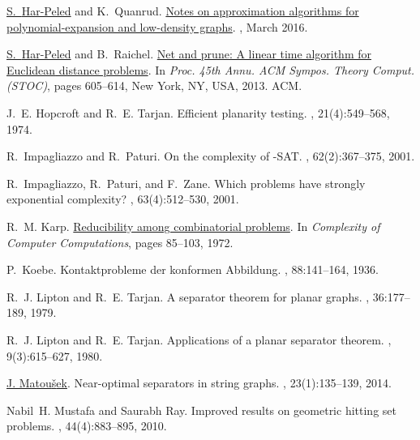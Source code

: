 \documentclass[12pt]{article}
\theoremstyle{remark}\theoremheaderfont{\sf}\theorembodyfont{\upshape}
\numberwithin{figure}{section}\numberwithin{table}{section}\numberwithin{equation}{section}
\begin{document}
{\begin{thebibliography}{vdSOdBV98}
\href{http://sarielhp.org}{S.~{{Har-Peled}}} and K.~{Quanrud}.
\newblock \href{http://arxiv.org/abs/1603.03098}{Notes on approximation
  algorithms for polynomial-expansion and low-density graphs}.
, March 2016.

\href{http://sarielhp.org}{S.~{{Har-Peled}}} and B.~Raichel.
\newblock \href{http://cs.uiuc.edu/~sariel/papers/12/aggregate/}{Net and prune:
  A linear time algorithm for {Euclidean} distance problems}.
\newblock In {\em Proc. 45th Annu. ACM Sympos. Theory Comput. {\em(STOC)}},
  pages 605--614, New York, NY, USA, 2013. ACM.

J.~E. Hopcroft and R.~E. Tarjan.
\newblock  Efficient planarity testing.
, 21(4):549--568, 1974.

R.~Impagliazzo and R.~Paturi.
\newblock  On the complexity of {}-{SAT}.
, 62(2):367--375, 2001.

R.~Impagliazzo, R.~Paturi, and F.~Zane.
\newblock  Which problems have strongly exponential complexity?
, 63(4):512--530, 2001.

R.~M. Karp.
\newblock
  \href{http://www.cs.berkeley.edu/luca/cs172/karp.pdf}{Reducibility
  among combinatorial problems}.
\newblock In {\em Complexity of Computer Computations}, pages 85--103, 1972.

P.~Koebe.
\newblock  Kontaktprobleme der konformen {Abbildung}.
, 88:141--164, 1936.

R.~J. Lipton and R.~E. Tarjan.
\newblock  A separator theorem for planar graphs.
, 36:177--189, 1979.

R.~J. Lipton and R.~E. Tarjan.
\newblock  Applications of a planar separator theorem.
, 9(3):615--627, 1980.

\href{http://kam.mff.cuni.cz/~matousek}{J. Matou{\v s}ek}.
\newblock  Near-optimal separators in string graphs.
, 23(1):135--139, 2014.

Nabil~H. Mustafa and Saurabh Ray.
\newblock  Improved results on geometric hitting set problems.
, 44(4):883--895, 2010.


\end{thebibliography}}
\end{document}
